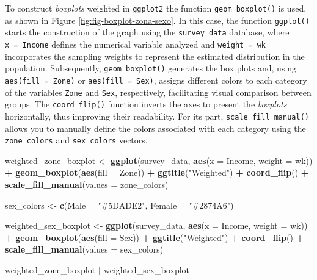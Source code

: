 \documentclass[
  english,
  12pt,
]{book}
\newenvironment{Shaded}{\begin{snugshade}}{\end{snugshade}}
\newcommand{\AttributeTok}[1]{\textcolor[rgb]{0.13,0.29,0.53}{#1}}
\newcommand{\FunctionTok}[1]{\textcolor[rgb]{0.13,0.29,0.53}{\textbf{#1}}}
\newcommand{\NormalTok}[1]{#1}
\newcommand{\OtherTok}[1]{\textcolor[rgb]{0.56,0.35,0.01}{#1}}
\newcommand{\SpecialCharTok}[1]{\textcolor[rgb]{0.81,0.36,0.00}{\textbf{#1}}}
\newcommand{\StringTok}[1]{\textcolor[rgb]{0.31,0.60,0.02}{#1}}
\begin{document}
To construct \emph{boxplots} weighted in \texttt{ggplot2} the function \texttt{geom\_boxplot()} is used, as shown in Figure \ref{fig:fig-boxplot-zona-sexo}. In this case, the function \texttt{ggplot()} starts the construction of the graph using the \texttt{survey\_data} database, where \texttt{x\ =\ Income} defines the numerical variable analyzed and \texttt{weight\ =\ wk} incorporates the sampling weights to represent the estimated distribution in the population. Subsequently, \texttt{geom\_boxplot()} generates the box plots and, using \texttt{aes(fill\ =\ Zone)} or \texttt{aes(fill\ =\ Sex)}, assigns different colors to each category of the variables \texttt{Zone} and \texttt{Sex}, respectively, facilitating visual comparison between groups. The \texttt{coord\_flip()} function inverts the axes to present the \emph{boxplots} horizontally, thus improving their readability. For its part, \texttt{scale\_fill\_manual()} allows you to manually define the colors associated with each category using the \texttt{zone\_colors} and \texttt{sex\_colors} vectors.

\begin{Shaded}
\begin{Highlighting}[]
\NormalTok{weighted\_zone\_boxplot }\OtherTok{\textless{}{-}} \FunctionTok{ggplot}\NormalTok{(survey\_data, }\FunctionTok{aes}\NormalTok{(}\AttributeTok{x =}\NormalTok{ Income, }\AttributeTok{weight =}\NormalTok{ wk)) }\SpecialCharTok{+}
  \FunctionTok{geom\_boxplot}\NormalTok{(}\FunctionTok{aes}\NormalTok{(}\AttributeTok{fill =}\NormalTok{ Zone)) }\SpecialCharTok{+}
  \FunctionTok{ggtitle}\NormalTok{(}\StringTok{"Weighted"}\NormalTok{) }\SpecialCharTok{+}
  \FunctionTok{coord\_flip}\NormalTok{() }\SpecialCharTok{+}
  \FunctionTok{scale\_fill\_manual}\NormalTok{(}\AttributeTok{values =}\NormalTok{ zone\_colors)}

\NormalTok{sex\_colors }\OtherTok{\textless{}{-}} \FunctionTok{c}\NormalTok{(}\AttributeTok{Male =} \StringTok{"\#5DADE2"}\NormalTok{, }\AttributeTok{Female =} \StringTok{"\#2874A6"}\NormalTok{)}

\NormalTok{weighted\_sex\_boxplot }\OtherTok{\textless{}{-}} \FunctionTok{ggplot}\NormalTok{(survey\_data, }\FunctionTok{aes}\NormalTok{(}\AttributeTok{x =}\NormalTok{ Income, }\AttributeTok{weight =}\NormalTok{ wk)) }\SpecialCharTok{+}
  \FunctionTok{geom\_boxplot}\NormalTok{(}\FunctionTok{aes}\NormalTok{(}\AttributeTok{fill =}\NormalTok{ Sex)) }\SpecialCharTok{+}
  \FunctionTok{ggtitle}\NormalTok{(}\StringTok{"Weighted"}\NormalTok{) }\SpecialCharTok{+}
  \FunctionTok{coord\_flip}\NormalTok{() }\SpecialCharTok{+}
  \FunctionTok{scale\_fill\_manual}\NormalTok{(}\AttributeTok{values =}\NormalTok{ sex\_colors)}

\NormalTok{weighted\_zone\_boxplot }\SpecialCharTok{|}\NormalTok{ weighted\_sex\_boxplot}
\end{Highlighting}
\end{Shaded}
\end{document}
